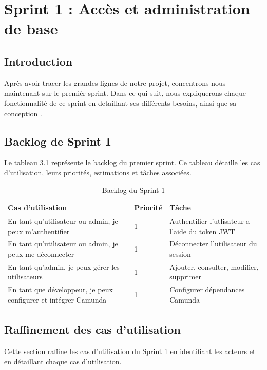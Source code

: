 \chapter{Sprint 1 : Accès et administration de base}

\section{Introduction}

Après avoir tracer les grandes lignes de notre projet, concentrons-nous maintenant sur le
premièr sprint. Dans ce qui suit, nous expliquerons chaque fonctionnalité de ce sprint
en detaillant ses différents besoins, ainsi que sa conception .
\section{Backlog de Sprint 1}
Le tableau 3.1 représente le backlog du premier sprint. Ce tableau détaille les cas d’utilisation, leurs priorités, estimations et tâches associées.
\begin{table}[!ht]
\begin{adjustwidth}{-2cm}{-2cm}
\centering
\caption{Backlog du Sprint 1}
\label{tab:backlog_sprint1}
\begin{tabular}{ | m{9cm} | m{1.2cm} | m{4.5cm} | }
\hline
\cellcolor[rgb]{0.832,0.832,0.832}Cas d'utilisation & \cellcolor[rgb]{0.832,0.832,0.832}Priorité & \cellcolor[rgb]{0.832,0.832,0.832}Tâche \\
\hline
En tant qu’utilisateur ou admin, je peux m’authentifier & 1 & Authentifier l'utlisateur a l'aide du token JWT \\
\hline
En tant qu’utilisateur ou admin, je peux me déconnecter & 1 & Déconnecter l'utilisateur du session \\
\hline
En tant qu’admin, je peux gérer les utilisateurs & 1 & Ajouter, consulter, modifier, supprimer \\
\hline
En tant que développeur, je peux configurer et intégrer Camunda & 1 & Configurer dépendances Camunda \\
\hline
\end{tabular}
\end{adjustwidth}
\end{table}
\newpage
\section{Raffinement des cas d'utilisation}
Cette section raffine les cas d’utilisation du Sprint 1 en identifiant les acteurs et en détaillant chaque cas d’utilisation.

